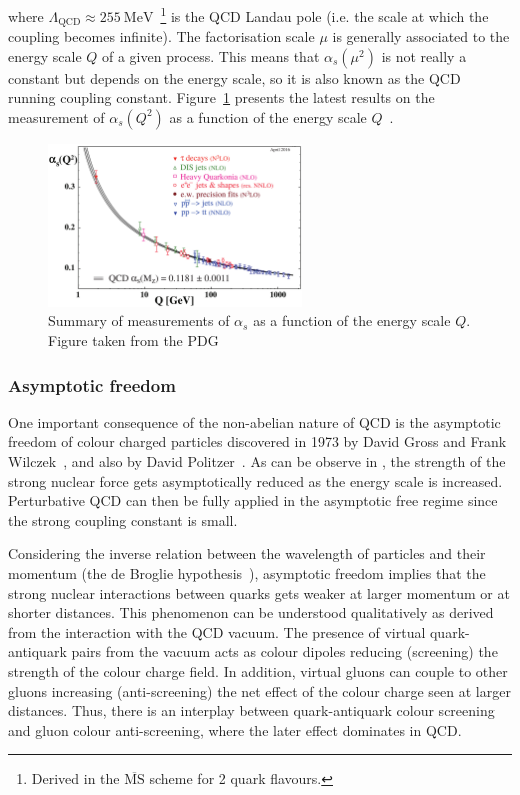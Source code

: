 where $\Lambda_{\text{QCD}} \approx \SI{255}{\MeV}$~\cite{LambdaQCD}\footnote{Derived in the $\overline{\text{MS}}$ scheme for 2 quark flavours.} is the QCD Landau pole (i.e. the scale at which the coupling becomes infinite). The factorisation scale $\mu$ is generally associated to the energy scale $Q$ of a given process. This means that $\alpha_{s}\left(\mu^{2}\right)$ is not really a constant but depends on the energy scale, so it is also known as the QCD running coupling constant. Figure~\ref{fig:Alphas} presents the latest results on the measurement of $\alpha_{s}\left(Q^{2}\right)$ as a function of the energy scale $Q$~\cite{PDG}.

\begin{figure}[htbp]
 \centering
 \includegraphics[width=0.6\textwidth]{Figures/Introduction/StandardModel/Alphas.png}
 \caption{Summary of measurements of $\alpha_{s}$ as a function of the energy scale $Q$. Figure taken from the PDG~\cite{PDG}}
 \label{fig:Alphas}
\end{figure}

\subsubsection{Asymptotic freedom}

One important consequence of the non-abelian nature of QCD is the asymptotic freedom of colour charged particles discovered in 1973 by David Gross and Frank Wilczek~\cite{AsymptoticFreedom_1}, and also by David Politzer~\cite{AsymptoticFreedom_2}. As can be observe in , the strength of the strong nuclear force gets asymptotically reduced as the energy scale is increased. Perturbative QCD can then be fully applied in the asymptotic free regime since the strong coupling constant is small.

Considering the inverse relation between the wavelength of particles and their momentum (the de Broglie hypothesis~\cite{Broglie}), asymptotic freedom implies that the strong nuclear interactions between quarks gets weaker at larger momentum or at shorter distances. This phenomenon can be understood qualitatively as derived from the interaction with the QCD vacuum. The presence of virtual quark-antiquark pairs from the vacuum acts as colour dipoles reducing (screening) the strength of the colour charge field. In addition, virtual gluons can couple to other gluons increasing (anti-screening) the net effect of the colour charge seen at larger distances. Thus, there is an interplay between quark-antiquark colour screening and gluon colour anti-screening, where the later effect dominates in QCD.

